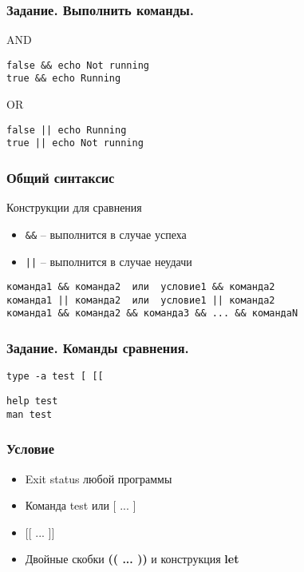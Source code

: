 \begin{frame}[fragile]
    \frametitle{ Задание. Выполнить команды.}
\begin{block}{AND}
	\small\begin{lstlisting}
false && echo Not running
true && echo Running
	\end{lstlisting}
\end{block}

\begin{block}{OR}
	\small\begin{lstlisting}
false || echo Running
true || echo Not running
	\end{lstlisting}
\end{block}
\end{frame}

\begin{frame}[fragile]
    \frametitle{Общий синтаксис}

	\begin{block}{Конструкции для сравнения}
		\begin{itemize}
			\item {\tt \&\&} -- выполнится в случае успеха
			\item {\tt ||} -- выполнится в случае неудачи
		\end{itemize}
	\end{block}

	\begin{verbatim}
команда1 && команда2  или  условие1 && команда2 
команда1 || команда2  или  условие1 || команда2 
команда1 && команда2 && команда3 && ... && командаN
	\end{verbatim}

\end{frame}


\begin{frame}[fragile]
   \frametitle{Задание. Команды сравнения.}

	\small\begin{lstlisting}
type -a test [ [[
	\end{lstlisting}

	\small\begin{lstlisting}
help test
man test
	\end{lstlisting}
\end{frame}

\begin{frame}
    \frametitle{Условие}
		\begin{itemize}
			\item Exit status любой программы
			\item Команда test или $[$ ... $]$
			\item $[[$ ... $]]$
			\item Двойные скобки {\bf (( ... ))} и конструкция {\bf let}
		\end{itemize}
\end{frame}


